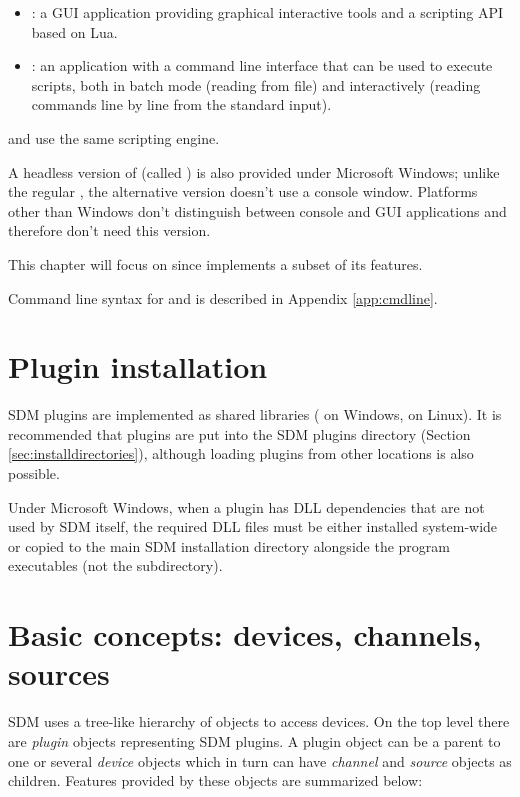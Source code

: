 \documentclass[a4paper,12pt,twoside,extrafontsizes]{memoir}
\begin{document}
\begin{itemize}
	\item {}: a GUI application providing graphical interactive tools and a scripting API based on Lua.
	\item {}: an application with a command line interface that can be used to execute scripts, both in batch mode (reading from file) and interactively (reading commands line by line from the standard input).
\end{itemize}

 and  use the same scripting engine.

A headless version of  (called ) is also provided under Microsoft Windows; unlike the regular , the alternative version doesn't use a console window. Platforms other than Windows don't distinguish between console and GUI applications and therefore don't need this version.

This chapter will focus on  since  implements a subset of its features.

Command line syntax for  and  is described in Appendix \ref{app:cmdline}.

\section{Plugin installation}

SDM plugins are implemented as shared libraries ( on Windows,  on Linux). It is recommended that plugins are put into the SDM plugins directory (Section \ref{sec:installdirectories}), although loading plugins from other locations is also possible.

Under Microsoft Windows, when a plugin has DLL dependencies that are not used by SDM itself, the required DLL files must be either installed system-wide or copied to the main SDM installation directory alongside the program executables (not the  subdirectory).

\section{Basic concepts: devices, channels, sources}

SDM uses a tree-like hierarchy of objects to access devices. On the top level there are \emph{plugin} objects representing SDM plugins. A plugin object can be a parent to one or several \emph{device} objects which in turn can have \emph{channel} and \emph{source} objects as children. Features provided by these objects are summarized below:
\end{document}
